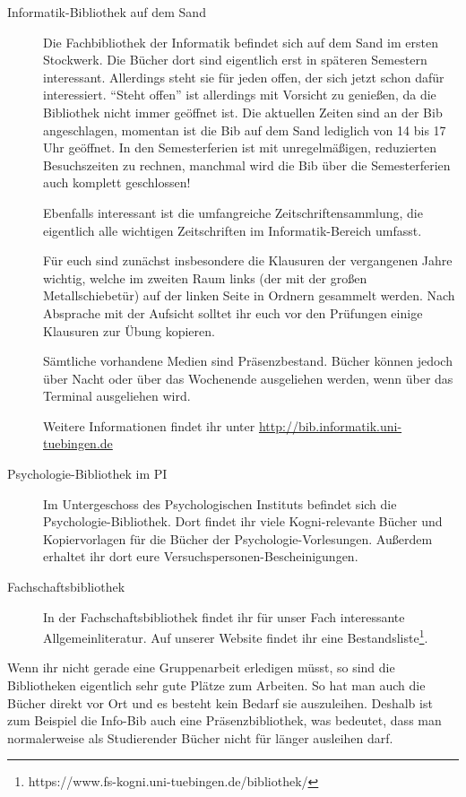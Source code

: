 \begin{description}
	\item[Informatik-Bibliothek auf dem Sand]
	Die Fachbibliothek der Informatik befindet sich auf dem Sand
	im ersten Stockwerk.  Die Bücher dort sind eigentlich erst in
	späteren Semestern interessant.  Allerdings steht sie für jeden
	offen, der sich jetzt schon dafür interessiert.  "`Steht
	offen"' ist allerdings mit Vorsicht zu genießen, da die
	Bibliothek nicht immer geöffnet ist. Die aktuellen Zeiten
	sind an der Bib angeschlagen, momentan ist die Bib auf dem Sand lediglich von 14 bis 17 Uhr geöffnet.
	In den Semesterferien ist mit unregelmäßigen, reduzierten Besuchszeiten zu rechnen, manchmal wird die Bib über die Semesterferien auch komplett geschlossen!
	
	Ebenfalls interessant ist die umfangreiche Zeitschriftensammlung,
	die eigentlich alle wichtigen Zeitschriften im
	Informatik-Bereich umfasst.
	
	Für euch sind zunächst insbesondere die Klausuren der
	vergangenen Jahre wichtig, welche im zweiten Raum links (der mit
	der großen Metallschiebetür) auf der linken Seite in Ordnern gesammelt
	werden.  Nach Absprache mit der Aufsicht solltet ihr euch vor den
	Prüfungen einige Klausuren zur Übung kopieren.
	
	Sämtliche vorhandene Medien sind Präsenzbestand. Bücher können
	jedoch über Nacht oder über das Wochenende ausgeliehen werden, wenn über das Terminal ausgeliehen wird.
	
	Weitere Informationen findet ihr unter \url{http://bib.informatik.uni-tuebingen.de}	%
	
	\item[Psychologie-Bibliothek im PI]
Im Untergeschoss des Psychologischen Instituts befindet sich die Psychologie-Bibliothek. Dort findet ihr viele Kogni-relevante Bücher und Kopiervorlagen für die Bücher der Psychologie-Vorlesungen. Außerdem erhaltet ihr dort eure Versuchspersonen-Bescheinigungen.
	
        \item[Fachschaftsbibliothek]
        In der Fachschaftsbibliothek findet ihr für unser Fach interessante Allgemeinliteratur. Auf unserer Website findet ihr eine Bestandsliste\footnote{https://www.fs-kogni.uni-tuebingen.de/bibliothek/}.
\end{description}

Wenn ihr nicht gerade eine Gruppenarbeit erledigen müsst, so sind die
Bibliotheken eigentlich sehr gute Plätze zum Arbeiten.  So hat man
auch die Bücher direkt vor Ort und es besteht kein Bedarf sie
auszuleihen.  Deshalb ist zum Beispiel die Info-Bib auch eine
Präsenzbibliothek, was bedeutet, dass man normalerweise als
Studierender Bücher nicht für länger ausleihen darf.



